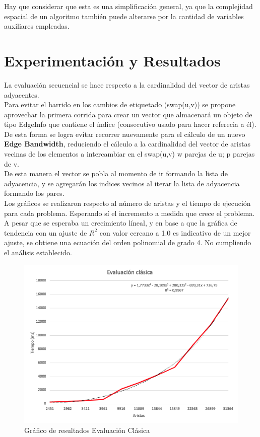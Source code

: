 \documentclass[oneside,onecolumn]{article}
\begin{document}
Hay que considerar que esta es una simplificación general, ya que la complejidad espacial de un algoritmo también puede alterarse por la cantidad de variables auxiliares empleadas.


\section{Experimentación y Resultados}

La evaluación secuencial se hace respecto a la cardinalidad del vector de aristas adyacentes.\\

Para evitar el barrido en los cambios de etiquetado (swap(u,v)) se propone aprovechar la primera corrida para crear un vector que almacenará un objeto de tipo EdgeInfo que contiene el índice (consecutivo usado para hacer referecia a él). De esta forma se logra evitar recorrer nuevamente para el cálculo de un nuevo \textbf{Edge Bandwidth}, reduciendo el cálculo a la cardinalidad del vector de aristas vecinas de los elementos a intercambiar en el swap(u,v) w parejas de u; p parejas de v.\\

De esta manera el vector se pobla al momento de ir formando la lista de adyacencia, y se agregarán los indices vecinos al iterar la lista de adyacencia formando los pares.\\

Los gráficos se realizaron respecto al número de aristas y el tiempo de ejecución para cada problema. Esperando sí el incremento a medida que crece el problema. A pesar que se esperaba un crecimiento líneal, y en base a que la gráfica de tendencia con un ajuste de $R^2$ con valor cercano a 1.0 es indicativo de un mejor ajuste, se obtiene una ecuación del orden polinomial de grado 4. No cumpliendo el análisis establecido.

\newpage

\begin{figure}[h]
  \centering
  \includegraphics[scale=0.52]{graficos/eval_clasic.png}
  \caption{Gráfico de resultados Evaluación Clásica}
\end{figure}
\end{document}
